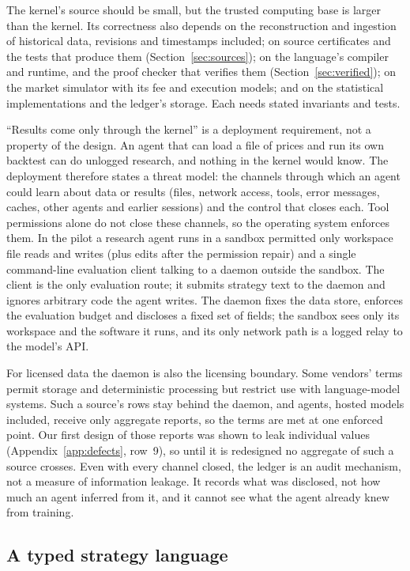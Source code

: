 \documentclass[11pt]{article}
\begin{document}
The kernel's source should be small, but the trusted computing base is larger than the kernel. Its correctness also depends on the reconstruction and ingestion of historical data, revisions and timestamps included; on source certificates and the tests that produce them (Section~\ref{sec:sources}); on the language's compiler and runtime, and the proof checker that verifies them (Section~\ref{sec:verified}); on the market simulator with its fee and execution models; and on the statistical implementations and the ledger's storage. Each needs stated invariants and tests.

``Results come only through the kernel'' is a deployment requirement, not a property of the design. An agent that can load a file of prices and run its own backtest can do unlogged research, and nothing in the kernel would know. The deployment therefore states a threat model: the channels through which an agent could learn about data or results (files, network access, tools, error messages, caches, other agents and earlier sessions) and the control that closes each. Tool permissions alone do not close these channels, so the operating system enforces them. In the pilot a research agent runs in a sandbox permitted only workspace file reads and writes (plus edits after the permission repair) and a single command-line evaluation client talking to a daemon outside the sandbox. The client is the only evaluation route; it submits strategy text to the daemon and ignores arbitrary code the agent writes. The daemon fixes the data store, enforces the evaluation budget and discloses a fixed set of fields; the sandbox sees only its workspace and the software it runs, and its only network path is a logged relay to the model's API.

For licensed data the daemon is also the licensing boundary. Some vendors' terms permit storage and deterministic processing but restrict use with language-model systems. Such a source's rows stay behind the daemon, and agents, hosted models included, receive only aggregate reports, so the terms are met at one enforced point. Our first design of those reports was shown to leak individual values (Appendix~\ref{app:defects}, row~9), so until it is redesigned no aggregate of such a source crosses. Even with every channel closed, the ledger is an audit mechanism, not a measure of information leakage. It records what was disclosed, not how much an agent inferred from it, and it cannot see what the agent already knew from training.

\subsection{A typed strategy language}\label{sec:dsl}
\end{document}
